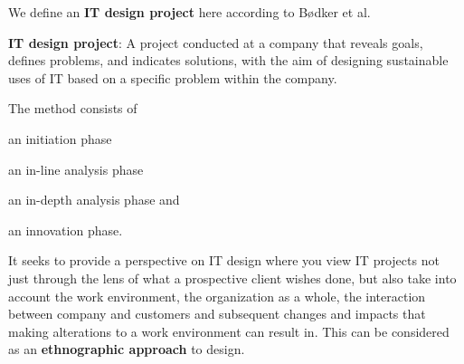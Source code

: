 We define an \textbf{IT design project} here according to B\o dker et al.\ 
\vspace{5mm}
\begin{framed}
    \textbf{IT design project}: A project conducted at a company that reveals
    goals, defines problems, and indicates solutions, with the aim of designing
    sustainable uses of IT based on a specific problem within the company.\cite{bodker2004participatory}
\end{framed}
\vspace{5mm}
The \must{}\cite{bodker2004participatory} method consists of
\begin{inparaenum}[1)]
    \item an initiation phase
    \item an in-line analysis phase
    \item an in-depth analysis phase and
    \item an innovation phase.
\end{inparaenum}
It seeks to provide a perspective on IT design where you view IT projects not
just through the lens of what a prospective client wishes done, but also take into
account the work environment, the organization as a whole, the interaction
between company and customers and subsequent changes and impacts that making
alterations to a work environment can result in. This can be considered as an 
\textbf{ethnographic approach} to design.

